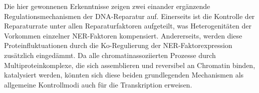 Die hier gewonnenen Erkenntnisse zeigen zwei einander erg\"{a}nzende Regulationsmechanismen der DNA-Reparatur auf. Einerseits ist die Kontrolle der Reparaturrate unter allen Reparaturfaktoren aufgeteilt, was Heterogenit\"{a}ten der Vorkommen einzelner NER-Faktoren kompensiert. Andererseits, werden diese Proteinfluktuationen durch die Ko-Regulierung der NER-Faktorexpression zus\"{a}tzlich einged\"{a}mmt. Da alle chromatinassoziierten Prozesse durch Multiproteinkomplexe, die sich assemblieren und reversibel an Chromatin binden, katalysiert werden, k\"{o}nn\-ten sich diese beiden grundlegenden Mechanismen als allgemeine Kontrollmodi auch f\"{u}r die Transkription erweisen.  


  




